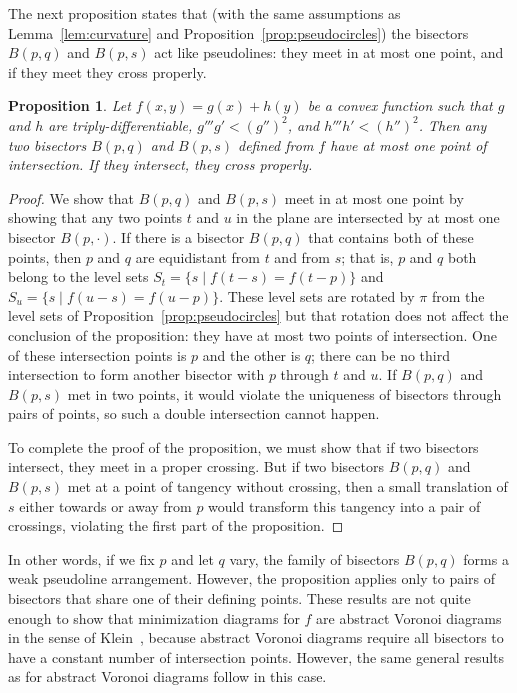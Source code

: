 \documentclass[10pt, conference, compsocconf]{IEEEtran}
\newtheorem{proposition}[theorem]{Proposition}
\begin{document}
The next proposition states that (with the same assumptions as Lemma~\ref{lem:curvature} and Proposition~\ref{prop:pseudocircles}) the bisectors $B(p,q)$ and $B(p,s)$ act like pseudolines: they meet in at most one point, and if they meet they cross properly.

\begin{proposition}
\label{prop:pseudolines}
Let $f(x,y)=g(x)+h(y)$ be a convex function such that $g$ and $h$ are triply-differentiable, $g'''g'<(g'')^2$, and $h'''h'<(h'')^2$. Then any two bisectors $B(p,q)$ and $B(p,s)$ defined from $f$ have at most one point of intersection. If they intersect, they cross properly.
\end{proposition}

\begin{proof}
We show that $B(p,q)$ and $B(p,s)$ meet in at most one point by showing that any two points $t$ and $u$ in the plane are intersected by at most one bisector $B(p,\cdot)$. If there is a bisector $B(p,q)$ that contains both of these points, then $p$ and $q$ are equidistant from $t$ and from $s$; that is, $p$ and $q$ both belong to the level sets $S_t=\{s\mid f(t-s)=f(t-p)\}$ and $S_u=\{s\mid f(u-s)=f(u-p)\}$. These level sets are rotated by $\pi$ from the level sets of Proposition~\ref{prop:pseudocircles} but that rotation does not affect the conclusion of the proposition: they have at most two points of intersection. One of these intersection points is $p$ and the other is $q$; there can be no third intersection to form another bisector with $p$ through $t$ and $u$. If $B(p,q)$ and $B(p,s)$ met in two points, it would violate the uniqueness of bisectors through pairs of points, so such a double intersection cannot happen.

To complete the proof of the proposition, we must show that if two bisectors intersect, they meet in a proper crossing. But if two bisectors $B(p,q)$ and $B(p,s)$ met at a point of tangency without crossing, then a small translation of $s$ either towards or away from $p$ would transform this tangency into a pair of crossings, violating the first part of the proposition.
\end{proof}

In other words, if we fix $p$ and let $q$ vary, the family of bisectors $B(p,q)$ forms a weak pseudoline arrangement. However, the proposition applies only to pairs of bisectors that share one of their defining points. These results are not quite enough to show that minimization diagrams for $f$ are abstract Voronoi diagrams in the sense of Klein~\cite{Kle-89}, because abstract Voronoi diagrams require all bisectors to have a constant number of intersection points. However, the same general results as for abstract Voronoi diagrams follow in this case.
\end{document}
